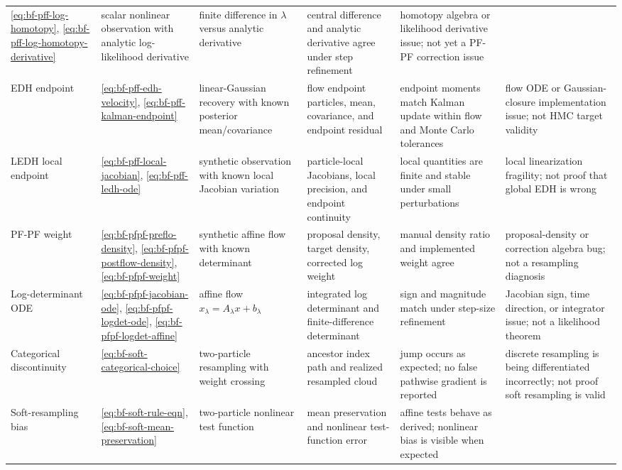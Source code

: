 \begin{center}
\begin{longtable}{@{}p{} p{} p{} p{} p{} p{}@{}}
\eqref{eq:bf-pff-log-homotopy}, \eqref{eq:bf-pff-log-homotopy-derivative} &
scalar nonlinear observation with analytic log-likelihood derivative &
finite difference in $\lambda$ versus analytic derivative &
central difference and analytic derivative agree under step refinement &
homotopy algebra or likelihood derivative issue; not yet a PF-PF correction issue \\
EDH endpoint &
\eqref{eq:bf-pff-edh-velocity}, \eqref{eq:bf-pff-kalman-endpoint} &
linear-Gaussian recovery with known posterior mean/covariance &
flow endpoint particles, mean, covariance, and endpoint residual &
endpoint moments match Kalman update within flow and Monte Carlo tolerances &
flow ODE or Gaussian-closure implementation issue; not HMC target validity \\
LEDH local endpoint &
\eqref{eq:bf-pff-local-jacobian}, \eqref{eq:bf-pff-ledh-ode} &
synthetic observation with known local Jacobian variation &
particle-local Jacobians, local precision, and endpoint continuity &
local quantities are finite and stable under small perturbations &
local linearization fragility; not proof that global EDH is wrong \\
PF-PF weight &
\eqref{eq:bf-pfpf-preflo-density}, \eqref{eq:bf-pfpf-postflow-density}, \eqref{eq:bf-pfpf-weight} &
synthetic affine flow with known determinant &
proposal density, target density, corrected log weight &
manual density ratio and implemented weight agree &
proposal-density or correction algebra bug; not a resampling diagnosis \\
Log-determinant ODE &
\eqref{eq:bf-pfpf-jacobian-ode}, \eqref{eq:bf-pfpf-logdet-ode}, \eqref{eq:bf-pfpf-logdet-affine} &
affine flow $x_\lambda=A_\lambda x+b_\lambda$ &
integrated log determinant and finite-difference determinant &
sign and magnitude match under step-size refinement &
Jacobian sign, time direction, or integrator issue; not a likelihood theorem \\
Categorical discontinuity &
\eqref{eq:bf-soft-categorical-choice} &
two-particle resampling with weight crossing &
ancestor index path and realized resampled cloud &
jump occurs as expected; no false pathwise gradient is reported &
discrete resampling is being differentiated incorrectly; not proof soft resampling is valid \\
Soft-resampling bias &
\eqref{eq:bf-soft-rule-eqn}, \eqref{eq:bf-soft-mean-preservation} &
two-particle nonlinear test function &
mean preservation and nonlinear test-function error &
affine tests behave as derived; nonlinear bias is visible when expected &

\end{longtable}
\end{center}
